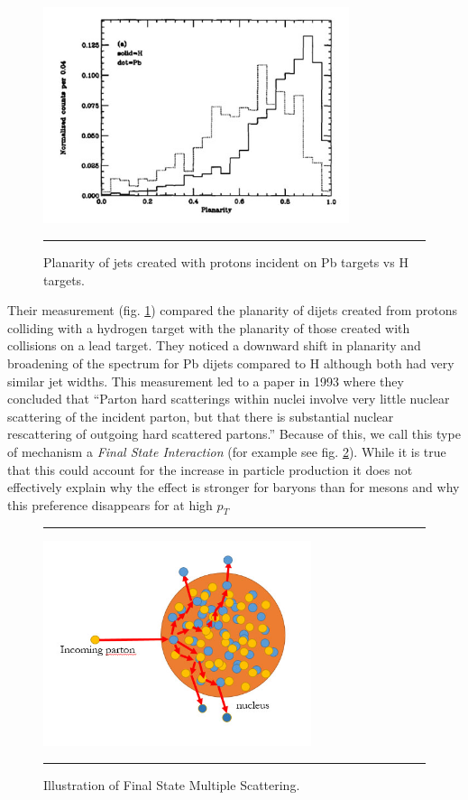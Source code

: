 \begin{figure}[htbp!]
  \centering
    \includegraphics[width=0.8\textwidth]{prevplots/e609planarity.jpg}
    \rule{35em}{0.5pt}
  \caption[Planarity of jets created with protons incident on Pb targets vs H targets.]{Planarity of jets created with protons incident on Pb targets vs H targets.}
  \label{fig:e609planarity}
\end{figure}
Their measurement (fig. \ref{fig:e609planarity}) compared the planarity of dijets created from protons colliding with a hydrogen target with the planarity of those created with collisions on a lead target. They noticed a downward shift in planarity and broadening of the spectrum for Pb dijets compared to H although both had very similar jet widths. This measurement led to a paper in 1993 where they concluded that “Parton hard scatterings within nuclei involve very little nuclear scattering of the incident parton, but that there is substantial nuclear rescattering of outgoing hard scattered partons.\citep{PhysRevLett.70.143}” Because of this, we call this type of mechanism a \textit{Final State Interaction} (for example see fig. \ref{fig:FSIscattering}). While it is true that this could account for the increase in particle production it does not effectively explain why the effect is stronger for baryons than for mesons and why this preference disappears for at high $p_{T}$
\begin{figure}[htbp!]
  \centering
    \rule{35em}{0.5pt}
    \includegraphics[width=0.7\textwidth]{Figures/FSIscattering.jpg}

  \caption[Illustration of Final State Multiple Scattering]{Illustration of Final State Multiple Scattering.}
  \label{fig:FSIscattering}
    \rule{35em}{0.5pt}
\end{figure} 

